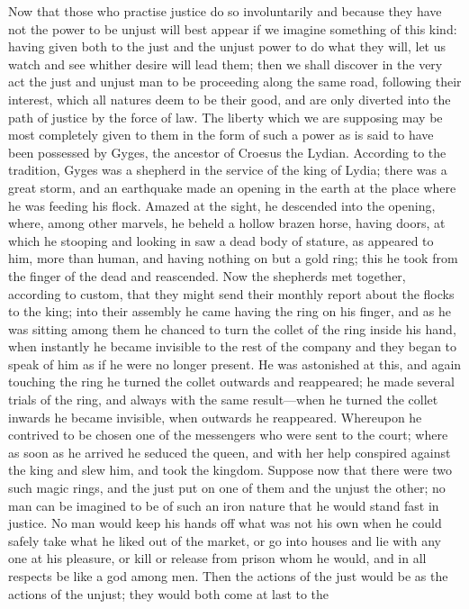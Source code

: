 Now that those who practise justice do so involuntarily and because
they have not the power to be unjust will best appear if we imagine
something of this kind: having given both to the just and the unjust
power to do what they will, let us watch and see whither desire will
lead them; then we shall discover in the very act the just and unjust
man to be proceeding along the same road, following their interest,
which all natures deem to be their good, and are only diverted into
the path of justice by the force of law. The liberty which we are
supposing may be most completely given to them in the form of such a
power as is said to have been possessed by Gyges, the ancestor of
Croesus the Lydian. According to the tradition, Gyges was a shepherd
in the service of the king of Lydia; there was a great storm, and an
earthquake made an opening in the earth at the place where he was
feeding his flock. Amazed at the sight, he descended into the opening,
where, among other marvels, he beheld a hollow brazen horse, having
doors, at which he stooping and looking in saw a dead body of stature,
as appeared to him, more than human, and having nothing on but a gold
ring; this he took from the finger of the dead and reascended. Now the
shepherds met together, according to custom, that they might send
their monthly report about the flocks to the king; into their assembly
he came having the ring on his finger, and as he was sitting among
them he chanced to turn the collet of the ring inside his hand, when
instantly he became invisible to the rest of the company and they
began to speak of him as if he were no longer present. He was
astonished at this, and again touching the ring he turned the collet
outwards and reappeared; he made several trials of the ring, and
always with the same result---when he turned the collet inwards he
became invisible, when outwards he reappeared. Whereupon he contrived
to be chosen one of the messengers who were sent to the court; where
as soon as he arrived he seduced the queen, and with her help
conspired against the king and slew him, and took the kingdom. Suppose
now that there were two such magic rings, and the just put on one of
them and the unjust the other; no man can be imagined to be of such an
iron nature that he would stand fast in justice. No man would keep his
hands off what was not his own when he could safely take what he liked
out of the market, or go into houses and lie with any one at his
pleasure, or kill or release from prison whom he would, and in all
respects be like a god among men. Then the actions of the just would
be as the actions of the unjust; they would both come at last to the
